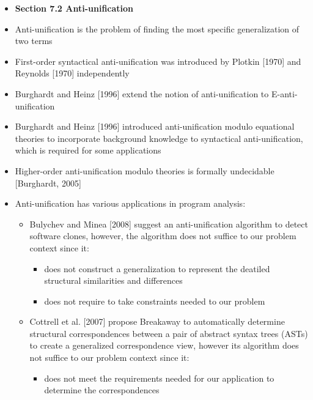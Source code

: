 \documentclass{article}
\newcommand{\bold}{\textbf}
\begin{document}
\begin{itemize} [leftmargin=.1in]
\item \bold{Section 7.2 Anti-unification}

\item Anti-unification is the problem of finding the most specific generalization of two terms
\item First-order syntactical anti-unification was introduced by Plotkin [1970] and Reynolds [1970] independently
\item Burghardt and Heinz [1996] extend the notion of anti-unification to E-anti-unification
\item Burghardt and Heinz [1996] introduced anti-unification
modulo equational theories to incorporate background knowledge to syntactical anti-unification, which is required for some applications
\item Higher-order anti-unification modulo theories is formally undecidable [Burghardt, 2005]
\item Anti-unification has various applications in program analysis:
\begin{itemize}
\item Bulychev and Minea [2008] suggest an anti-unification algorithm to detect software clones, however, the algorithm does not suffice to our problem context since it:
\begin{itemize}
\item does not construct a generalization to represent the deatiled structural similarities and differences
\item does not require to take constraints needed to our problem
\end{itemize}
\item Cottrell et al. [2007] propose Breakaway to automatically determine structural correspondences between a pair of abstract syntax trees (ASTs) to create a generalized correspondence view, however its algorithm does not suffice to our problem context since it:
\begin{itemize}
\item does not meet the requirements needed for our application to determine the correspondences
\end{itemize}


\end{itemize}
\end{itemize}
\end{document}
